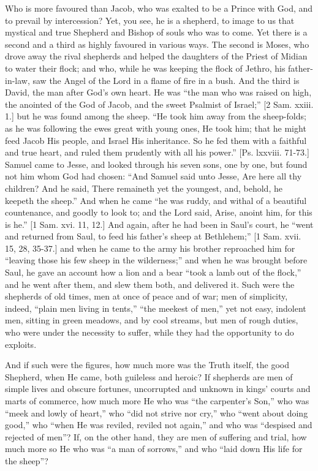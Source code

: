 Who is more favoured than Jacob, who was exalted to be a Prince
with God, and to prevail by intercession? Yet, you see, he is a
shepherd, to image to us that mystical and true Shepherd and Bishop of
souls who was to come. Yet there is a second and a third as highly
favoured in various ways. The second is Moses, who drove away the
rival shepherds and helped the daughters of the Priest of Midian to
water their flock; and who, while he was keeping the flock of Jethro,
his father-in-law, saw the Angel of the Lord in a flame of fire in a
bush. And the third is David, the man after God's own heart. He was
``the man who was raised on high, the anointed of the God of
Jacob, and the sweet Psalmist of Israel;'' [2 Sam. xxiii. 1.] but
he was found among the sheep. ``He took him away from the
sheep-folds; as he was following the ewes great with young ones, He
took him; that he might feed Jacob His people, and Israel His
inheritance. So he fed them with a faithful and true heart, and ruled
them prudently with all his power.'' [Ps. lxxviii. 71-73.] Samuel
came to Jesse, and looked through his seven sons, one by one, but
found not him whom God had chosen: ``And Samuel said unto Jesse,
Are here all thy children? And he said, There remaineth yet the
youngest, and, behold, he keepeth the sheep.'' And when he came
``he was ruddy, and withal of a beautiful countenance, and goodly
to look to; and the Lord said, Arise, anoint him, for this is
he.'' [1 Sam. xvi. 11, 12.] And again, after he had been in Saul's
court, he ``went and returned from Saul, to feed his father's
sheep at Bethlehem;'' [1 Sam. xvii. 15, 28, 35-37.] and when he
came to the army his brother reproached him for ``leaving those
his few sheep in the wilderness;'' and when he was brought before
Saul, he gave an account how a lion and a bear ``took a lamb out
of the flock,'' and he went after them, and slew them both, and
delivered it. Such were the shepherds of old times, men at once of
peace and of war; men of simplicity, indeed, ``plain men living in
tents,'' ``the meekest of men,'' yet not easy, indolent
men, sitting in green meadows, and by cool streams, but men of rough
duties, who were under the necessity to suffer, while they had the
opportunity to do exploits.

And if such were the figures, how much more was the Truth itself,
the good Shepherd, when He came, both guileless and heroic? If
shepherds are men of simple lives and obscure fortunes, uncorrupted
and unknown in kings' courts and marts of commerce, how much more He
who was ``the carpenter's Son,'' who was ``meek and lowly
of heart,'' who ``did not strive nor cry,'' who ``went
about doing good,'' who ``when He was reviled, reviled not
again,'' and who was ``despised and rejected of men''? If,
on the other hand, they are men of suffering and trial, how much more
so He who was ``a man of sorrows,'' and who ``laid down
His life for the sheep''?


